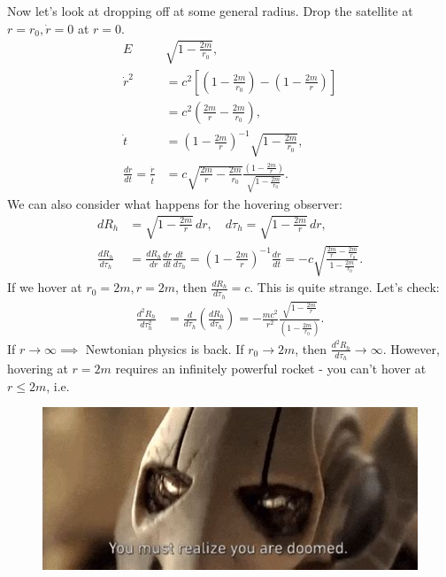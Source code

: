 \documentclass[a4paper, 11pt, normalem]{report}
\begin{document}
Now let's look at dropping off at some general radius.
Drop the satellite at $r=r_0,\dot{r}=0$ at $r=0$.
\begin{align}
    E & \sqrt{1-\frac{2m}{r_0}},\\
    \dot{r}^2 &= c^2\left[\left(1-\frac{2m}{r_0}\right)-\left(1-\frac{2m}{r}\right)\right] \\
              &= c^2\left(\frac{2m}{r} - \frac{2m}{r_0}\right), \\
    \dot{t} &= \left(1-\frac{2m}{r}\right)^{-1}\sqrt{1-\frac{2m}{r_0}},\\
    \frac{dr}{dt} = \frac{\dot{r}}{\dot{t}} &= c\sqrt{\frac{2m}{r}-\frac{2m}{r_0}}\frac{\left(1-\frac{2m}{r}\right)}{\sqrt{1-\frac{2m}{r_0}}}.
\end{align}
We can also consider what happens for the hovering observer:
\begin{align}
    dR_h &= \sqrt{1-\frac{2m}{r}}\,dr,\quad  d\tau_h = \sqrt{1-\frac{2m}{r}}\,dr, \\
    \frac{dR_h}{d\tau_h} &= \frac{dR_h}{dr}\frac{dr}{dt}\frac{dt}{d\tau_h} = \left(1-\frac{2m}{r}\right)^{-1}\frac{dr}{dt} = -c\sqrt{\frac{\frac{2m}{r}-\frac{2m}{r_0}}{1-\frac{2m}{r_0}}}.
\end{align}
If we hover at $r_0=2m,r=2m$, then $\frac{dR_h}{d\tau_h}=c$.
This is quite strange.
Let's check:
\begin{align}
    \frac{d^2R_h}{d\tau_h^2} &= \frac{d}{d\tau_h}\left(\frac{dR_h}{d\tau_h}\right) = -\frac{mc^2}{r^2}\frac{\sqrt{1-\frac{2m}{r}}}{\left(1-\frac{2m}{r_0}\right)}.
\end{align}
If $r\to\infty\implies$ Newtonian physics is back.
If $r_0\to2m$, then $\frac{d^2R_h}{d\tau_h}\to\infty$.
However, hovering at $r=2m$ requires an infinitely powerful rocket - you can't hover at $r\leq2m$, i.e.
\begin{figure}[H]
    \centering
    \includegraphics[scale=0.7]{gg.jpg}
\end{figure}
\end{document}
